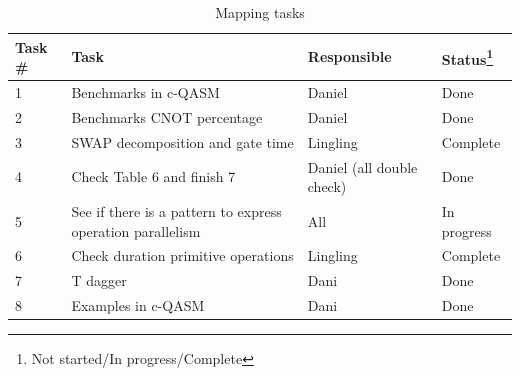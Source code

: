 \documentclass[11pt]{article}
\begin{document}
\begin{table}[!h]
\centering
\scriptsize
\caption{Mapping tasks}
\label{tab:openql-overview}
\begin{minipage}[c]{\linewidth}
\begin{tabular}{llll}
\toprule
Task \# & Task & Responsible  & Status\footnote{\scriptsize Not started/In progress/Complete} \\
\midrule
 1 & Benchmarks in c-QASM                          & Daniel    & Done  \\
 2 & Benchmarks CNOT percentage                    & Daniel         & Done      \\
 3 & SWAP decomposition and gate time             & Lingling        & Complete     \\
 4 & Check Table 6 and finish 7                  & Daniel (all double check)          & Done       \\
 5 & See if there is a pattern to express operation parallelism                 & All          & In progress     \\
 6 & Check duration primitive operations                 & Lingling         & Complete      \\
  7 & T dagger                 & Dani         & Done     \\
  8 & Examples in c-QASM                 & Dani         & Done      \\


\bottomrule
\end{tabular}
\end{minipage}
\end{table}    
    
\end{document}
